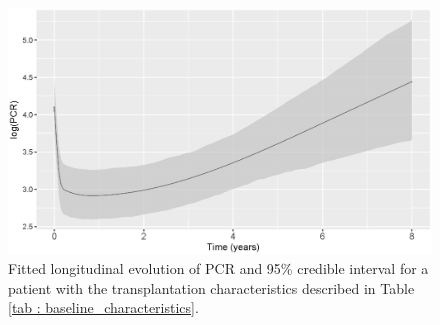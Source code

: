 \begin{figure}[!htb]
\centerline{\includegraphics[width=\columnwidth]{images/pcr.eps}}
\caption{Fitted longitudinal evolution of PCR and 95\% credible interval for a patient with the  transplantation characteristics described in Table \ref{tab : baseline_characteristics}.}
\label{fig : pcr_evolution}
\end{figure}